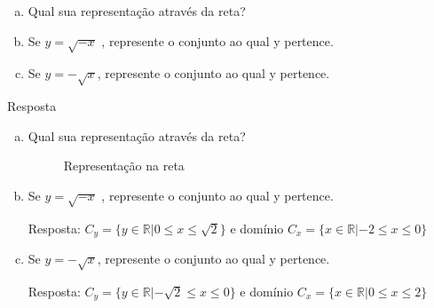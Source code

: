 \documentclass[12pt,onepage,a4paper]{memoir}
\begin{document}
\begin{enumerate}
    \begin{enumerate}[a)]
    \item  Qual sua representação através da reta?
    \item  Se $y = \sqrt{-x}$ , represente o conjunto ao qual y pertence.
    \item Se $y = -\sqrt{x}$, represente o conjunto ao qual y pertence.
    \end{enumerate}

Resposta

       \begin{enumerate}[a)]
       \item  Qual sua representação através da reta?


         \begin{figure}
           \centering
           \caption{Representação na reta}
         \end{figure}
         
       \item  Se $y = \sqrt{-x}$ , represente o conjunto ao qual y pertence.

Resposta: $C_y = \{y \in \mathbb{R} |  0 \leq x \leq \sqrt{2}\}$ e domínio $C_x=\{ x \in \mathbb{R} | -2 \leq x \leq 0  \}$
         
\item Se $y = -\sqrt{x}$, represente o conjunto ao qual y pertence.

  Resposta: $C_y = \{y \in \mathbb{R} |  -\sqrt{2} \leq x \leq 0\}$ e domínio $C_x=\{ x \in \mathbb{R} | 0 \leq x \leq 2  \}$
    \end{enumerate}
\end{enumerate} %
\end{document}
